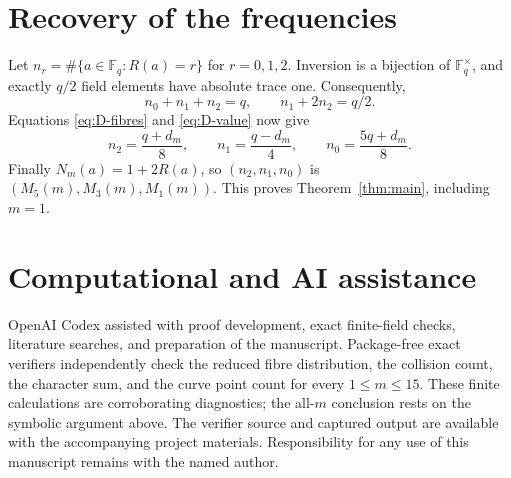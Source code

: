 \documentclass[11pt]{article}
\newcommand{\F}{\mathbb F}
\begin{document}
\section{Recovery of the frequencies}

Let $n_r=\#\{a\in\F_q:R(a)=r\}$ for $r=0,1,2$.  Inversion is a
bijection of $\F_q^{\times}$, and exactly $q/2$ field elements have absolute
trace one.  Consequently,
\[
 n_0+n_1+n_2=q,\qquad n_1+2n_2=q/2.
\]
Equations \eqref{eq:D-fibres} and \eqref{eq:D-value} now give
\[
 n_2=\frac{q+d_m}{8},\qquad
 n_1=\frac{q-d_m}{4},\qquad
 n_0=\frac{5q+d_m}{8}.
\]
Finally $N_m(a)=1+2R(a)$, so $(n_2,n_1,n_0)$ is
$(M_5(m),M_3(m),M_1(m))$.  This proves Theorem~\ref{thm:main}, including
$m=1$.

\section*{Computational and AI assistance}

OpenAI Codex assisted with proof development, exact finite-field checks,
literature searches, and preparation of the manuscript.  Package-free exact
verifiers independently check the reduced fibre distribution, the collision
count, the character sum, and the curve point count for every
$1\leq m\leq15$.  These finite calculations are corroborating diagnostics;
the all-$m$ conclusion rests on the symbolic argument above.  The verifier
source and captured output are available with the accompanying project
materials.  Responsibility for any use of this manuscript remains with the
named author.



\end{document}
